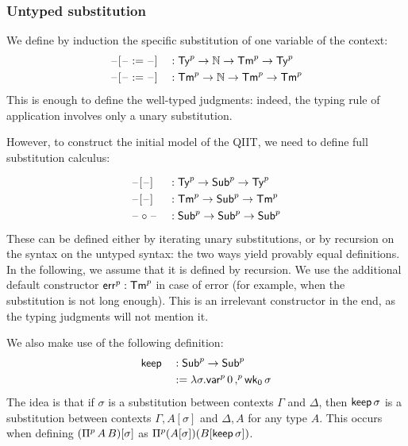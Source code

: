   \subsubsection{Untyped substitution}
  We define by induction the specific substitution of one variable of the context:
\begin{alignat*}{5}
  & \blank[\blank := \blank] && : \Tyu\ra\N\ra\Tmu\ra\Tyu \\
  & \blank[\blank := \blank] && : \Tmu\ra\N\ra\Tmu\ra\Tmu
  \end{alignat*}
  This is enough to define the well-typed judgments: indeed, the typing rule of application
  involves only a unary substitution.


  However, to construct the initial model of the QIIT, we need to define
  full substitution calculus:

\begin{alignat*}{5}
  & \blank[\blank] && : \Tyu\ra\Subu\ra\Tyu \\
  & \blank[\blank] && : \Tmu\ra\Subu\ra\Tmu \\
  & \blank \circ \blank && : \Subu\ra\Subu\ra \Subu
  \end{alignat*}
  These can be defined either by iterating unary substitutions, or
  by recursion on the syntax on the untyped syntax: the two ways yield provably
  equal definitions. In the following, we assume that it is defined by recursion.
 We use the additional default constructor
$\erru:\Tmu$ in case of error (for example, when the substitution is not
long enough).
This is an irrelevant constructor in the end, as the typing
judgments will not mention it.

We also make use of the following definition:
  \begin{alignat*}{5}
  & \keep && : \Subu \ra \Subu \\
   &&& := \lambda \sigma. \varu\, 0 \,\consu\, \wkO\,\sigma
  \end{alignat*}
  The idea is that if $\sigma$ is a substitution between contexts $\Gamma$ and
  $\Delta$, then $\keep\,\sigma$ is a substitution between contexts $\Gamma, A[\sigma]$
  and $\Delta,A$ for any type $A$. This occurs when defining
  $(\Piu\,A\,B)[\sigma]$ as $\Piu (A[\sigma])(B[\keep \,\sigma])$.




